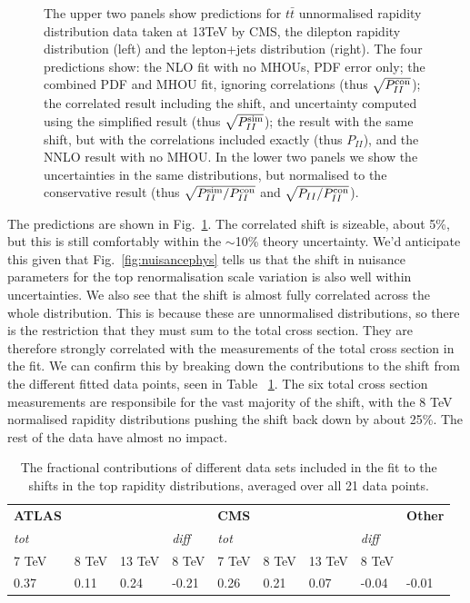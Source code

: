 \begin{figure}[t!]
  \caption{The upper two panels show predictions for $t\bar{t}$ unnormalised rapidity distribution data taken at 13TeV by CMS, the dilepton rapidity distribution \cite{Sirunyan:2018ucr} (left) and the lepton+jets distribution \cite{Sirunyan:2018wem} (right). The four predictions show: the NLO fit with no MHOUs, PDF error only; the combined PDF and MHOU fit, ignoring correlations (thus $\sqrt{P_{II}^{\rm con}}$); the correlated result including the shift, and uncertainty computed using the simplified result (thus $\sqrt{P_{II}^{\rm sim}}$); the result with the same shift, but with the correlations included exactly (thus $P_{II}$), and the NNLO result with no MHOU. In the lower two panels we show the uncertainties in the same distributions, but normalised to the conservative result (thus $\sqrt{P_{II}^{\rm sim}/P_{II}^{\rm con}}$ and $\sqrt{P_{II}/P_{II}^{\rm con}}$).}
  \label{fig:CMSttbar}
\end{figure}

The predictions are shown in Fig.~\ref{fig:CMSttbar}. The correlated shift is sizeable, about 5\%, but this is still comfortably within the $\sim$10\% theory uncertainty. We'd anticipate this given that Fig.~\ref{fig:nuisancephys} tells us that the shift in nuisance parameters for the top renormalisation scale variation is also well within uncertainties. We also see that the shift is almost fully correlated across the whole distribution. This is because these are unnormalised distributions, so there is the restriction that they must sum to the total cross section. They are therefore strongly correlated with the measurements of the total cross section in the fit. We can confirm this by breaking down the contributions to the shift from the different fitted data points, seen in Table ~\ref{tab:deltilcons}. The six total cross section measurements are responsibile for the vast majority of the shift, with the 8 TeV normalised rapidity distributions pushing the shift back down by about 25\%. The rest of the data have almost no impact.
\begin{table}[h]
  \centering
  \scriptsize
  \renewcommand{\arraystretch}{1.4}
  \begin{tabular}{|llll|llll|l|}
   \hline
 {\bf ATLAS} &&&& {\bf CMS} &&&& {\bf Other}\\
 {\it tot} &&&{\it diff} &{\it tot}&&&{\it diff} & \\
  7 TeV &  8 TeV & 13 TeV & 8 TeV &7 TeV & 8 TeV &13 TeV & 8 TeV & \\
    \hline
 0.37 & 0.11 & 0.24 & -0.21 & 0.26 & 0.21 & 0.07 & -0.04 & -0.01 \\
\hline
  \end{tabular}
\caption{The fractional contributions of different data sets included in the fit to the
shifts in the top rapidity distributions, averaged over all 21 data points.}
\label{tab:deltilcons}
\end{table}

